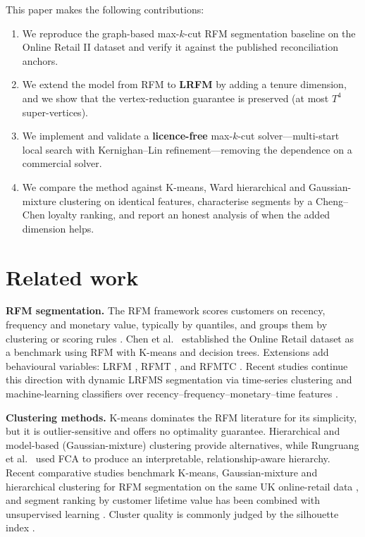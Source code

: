 \documentclass[pdflatex,sn-mathphys-num]{sn-jnl}%
\begin{document}
This paper makes the following contributions:
\begin{enumerate}
\item We reproduce the graph-based max-$k$-cut RFM segmentation baseline \cite{vianna2026} on the Online Retail II dataset and verify it against the published reconciliation anchors.
\item We extend the model from RFM to \textbf{LRFM} by adding a tenure dimension, and we show that the vertex-reduction guarantee is preserved (at most $T^{4}$ super-vertices).
\item We implement and validate a \textbf{licence-free} max-$k$-cut solver---multi-start local search with Kernighan--Lin refinement---removing the dependence on a commercial solver.
\item We compare the method against K-means, Ward hierarchical and Gaussian-mixture clustering on identical features, characterise segments by a Cheng--Chen loyalty ranking, and report an honest analysis of when the added dimension helps.
\end{enumerate}

\section{Related work}\label{sec:related}

\noindent\textbf{RFM segmentation.} The RFM framework scores customers on recency, frequency and monetary value, typically by quantiles, and groups them by clustering or scoring rules \cite{chengchen2009,christy2021}. Chen et al.\ \cite{chen2012} established the Online Retail dataset as a benchmark using RFM with K-means and decision trees. Extensions add behavioural variables: LRFM \cite{changtsay2004}, RFMT \cite{zhou2021}, and RFMTC \cite{yeh2009}. Recent studies continue this direction with dynamic LRFMS segmentation via time-series clustering \cite{wang2024} and machine-learning classifiers over recency--frequency--monetary--time features \cite{ullah2023}.

\noindent\textbf{Clustering methods.} K-means dominates the RFM literature for its simplicity, but it is outlier-sensitive and offers no optimality guarantee. Hierarchical and model-based (Gaussian-mixture) clustering provide alternatives, while Rungruang et al.\ \cite{rungruang2024} used FCA to produce an interpretable, relationship-aware hierarchy. Recent comparative studies benchmark K-means, Gaussian-mixture and hierarchical clustering for RFM segmentation on the same UK online-retail data \cite{john2023,lewaaelhamd2024}, and segment ranking by customer lifetime value has been combined with unsupervised learning \cite{chouaten2024}. Cluster quality is commonly judged by the silhouette index \cite{rousseeuw1987}.
\end{document}
